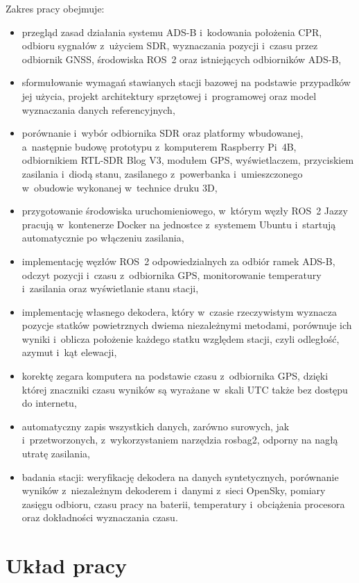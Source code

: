 Zakres pracy obejmuje:
\begin{itemize}
  \item przegląd zasad działania systemu ADS-B i~kodowania położenia CPR, odbioru sygnałów z~użyciem SDR, wyznaczania pozycji i~czasu przez odbiornik GNSS, środowiska ROS~2 oraz istniejących odbiorników ADS-B,
  \item sformułowanie wymagań stawianych stacji bazowej na podstawie przypadków jej użycia, projekt architektury sprzętowej i~programowej oraz model wyznaczania danych referencyjnych,
  \item porównanie i~wybór odbiornika SDR oraz platformy wbudowanej, a~następnie budowę prototypu z~komputerem Raspberry Pi~4B, odbiornikiem RTL-SDR Blog V3, modułem GPS, wyświetlaczem, przyciskiem zasilania i~diodą stanu, zasilanego z~powerbanka i~umieszczonego w~obudowie wykonanej w~technice druku 3D,
  \item przygotowanie środowiska uruchomieniowego, w~którym węzły ROS~2 Jazzy pracują w~kontenerze Docker na jednostce z~systemem Ubuntu i~startują automatycznie po włączeniu zasilania,
  \item implementację węzłów ROS~2 odpowiedzialnych za odbiór ramek ADS-B, odczyt pozycji i~czasu z~odbiornika GPS, monitorowanie temperatury i~zasilania oraz wyświetlanie stanu stacji,
  \item implementację własnego dekodera, który w~czasie rzeczywistym wyznacza pozycje statków powietrznych dwiema niezależnymi metodami, porównuje ich wyniki i~oblicza położenie każdego statku względem stacji, czyli odległość, azymut i~kąt elewacji,
  \item korektę zegara komputera na podstawie czasu z~odbiornika GPS, dzięki której znaczniki czasu wyników są wyrażane w~skali UTC także bez dostępu do internetu,
  \item automatyczny zapis wszystkich danych, zarówno surowych, jak i~przetworzonych, z~wykorzystaniem narzędzia rosbag2, odporny na nagłą utratę zasilania,
  \item badania stacji: weryfikację dekodera na danych syntetycznych, porównanie wyników z~niezależnym dekoderem i~danymi z~sieci OpenSky, pomiary zasięgu odbioru, czasu pracy na baterii, temperatury i~obciążenia procesora oraz dokładności wyznaczania czasu.
\end{itemize}

\section{Układ pracy}
\label{sec:uklad}


